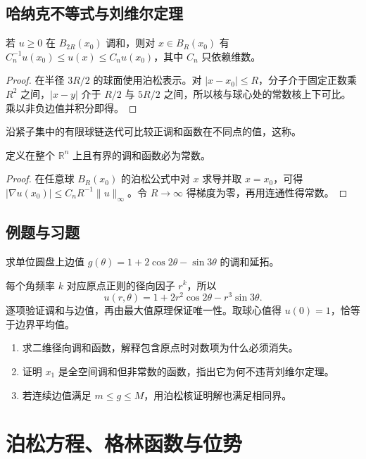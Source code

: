 \documentclass[UTF8,12pt,a4paper,fontset=fandol]{ctexbook}
\begin{document}
\section{哈纳克不等式与刘维尔定理}
\begin{proposition}[哈纳克不等式的局部形式]
若 $u\ge0$ 在 $B_{2R}(x_0)$ 调和，则对 $x\in B_R(x_0)$ 有 $C_n^{-1}u(x_0)\le u(x)\le C_nu(x_0)$，其中 $C_n$ 只依赖维数。
\end{proposition}
\begin{proof}
在半径 $3R/2$ 的球面使用泊松表示。对 $|x-x_0|\le R$，分子介于固定正数乘 $R^2$ 之间，$|x-y|$ 介于 $R/2$ 与 $5R/2$ 之间，所以核与球心处的常数核上下可比。乘以非负边值并积分即得。
\end{proof}
沿紧子集中的有限球链迭代可比较正调和函数在不同点的值，这称。

\begin{theorem}[刘维尔定理]
定义在整个 $\mathbb R^n$ 上且有界的调和函数必为常数。
\end{theorem}
\begin{proof}
在任意球 $B_R(x_0)$ 的泊松公式中对 $x$ 求导并取 $x=x_0$，可得 $|\nabla u(x_0)|\le C_nR^{-1}\|u\|_\infty$。令 $R\to\infty$ 得梯度为零，再用连通性得常数。
\end{proof}

\section{例题与习题}
\begin{example}
求单位圆盘上边值 $g(\theta)=1+2\cos2\theta-\sin3\theta$ 的调和延拓。
\end{example}
\begin{solve}
每个角频率 $k$ 对应原点正则的径向因子 $r^k$，所以
\[
 u(r,\theta)=1+2r^2\cos2\theta-r^3\sin3\theta.
\]
逐项验证调和与边值，再由最大值原理保证唯一性。取球心值得 $u(0)=1$，恰等于边界平均值。
\end{solve}
\begin{enumerate}
 \item 求二维径向调和函数，解释包含原点时对数项为什么必须消失。
 \item 证明 $x_1$ 是全空间调和但非常数的函数，指出它为何不违背刘维尔定理。
 \item 若连续边值满足 $m\le g\le M$，用泊松核证明解也满足相同界。
\end{enumerate}

\chapter{泊松方程、格林函数与位势}
\label{chap:green}
\end{document}
